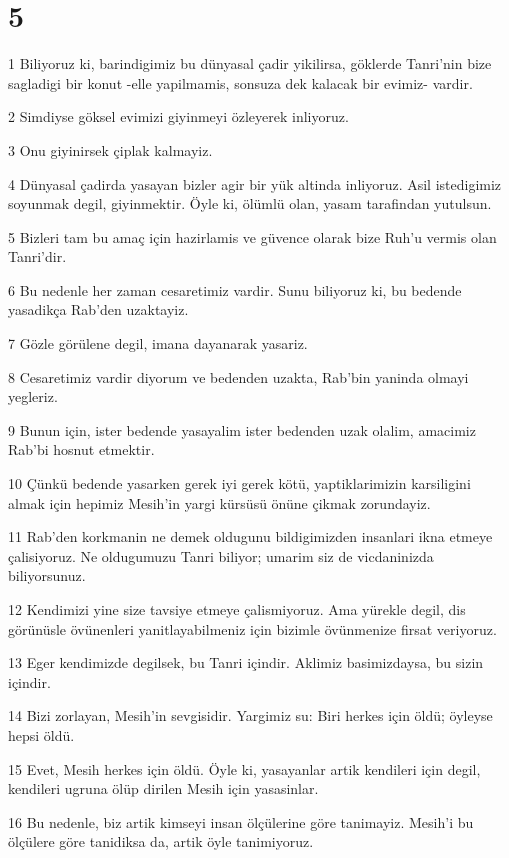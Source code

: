 \chapter{5}

\par 1 Biliyoruz ki, barindigimiz bu dünyasal çadir yikilirsa, göklerde Tanri'nin bize sagladigi bir konut -elle yapilmamis, sonsuza dek kalacak bir evimiz- vardir.
\par 2 Simdiyse göksel evimizi giyinmeyi özleyerek inliyoruz.
\par 3 Onu giyinirsek çiplak kalmayiz.
\par 4 Dünyasal çadirda yasayan bizler agir bir yük altinda inliyoruz. Asil istedigimiz soyunmak degil, giyinmektir. Öyle ki, ölümlü olan, yasam tarafindan yutulsun.
\par 5 Bizleri tam bu amaç için hazirlamis ve güvence olarak bize Ruh'u vermis olan Tanri'dir.
\par 6 Bu nedenle her zaman cesaretimiz vardir. Sunu biliyoruz ki, bu bedende yasadikça Rab'den uzaktayiz.
\par 7 Gözle görülene degil, imana dayanarak yasariz.
\par 8 Cesaretimiz vardir diyorum ve bedenden uzakta, Rab'bin yaninda olmayi yegleriz.
\par 9 Bunun için, ister bedende yasayalim ister bedenden uzak olalim, amacimiz Rab'bi hosnut etmektir.
\par 10 Çünkü bedende yasarken gerek iyi gerek kötü, yaptiklarimizin karsiligini almak için hepimiz Mesih'in yargi kürsüsü önüne çikmak zorundayiz.
\par 11 Rab'den korkmanin ne demek oldugunu bildigimizden insanlari ikna etmeye çalisiyoruz. Ne oldugumuzu Tanri biliyor; umarim siz de vicdaninizda biliyorsunuz.
\par 12 Kendimizi yine size tavsiye etmeye çalismiyoruz. Ama yürekle degil, dis görünüsle övünenleri yanitlayabilmeniz için bizimle övünmenize firsat veriyoruz.
\par 13 Eger kendimizde degilsek, bu Tanri içindir. Aklimiz basimizdaysa, bu sizin içindir.
\par 14 Bizi zorlayan, Mesih'in sevgisidir. Yargimiz su: Biri herkes için öldü; öyleyse hepsi öldü.
\par 15 Evet, Mesih herkes için öldü. Öyle ki, yasayanlar artik kendileri için degil, kendileri ugruna ölüp dirilen Mesih için yasasinlar.
\par 16 Bu nedenle, biz artik kimseyi insan ölçülerine göre tanimayiz. Mesih'i bu ölçülere göre tanidiksa da, artik öyle tanimiyoruz.
